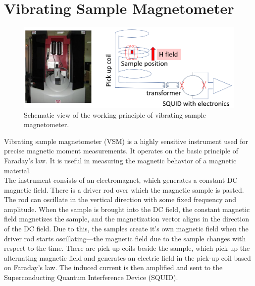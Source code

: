 \documentclass[12pt,a4paper,bold]{thesis}
\theoremstyle{thm}
\theoremstyle{definition}
\begin{document}
\section{Vibrating Sample Magnetometer}
\begin{figure}[H]
	\centering
   \includegraphics[width=12cm]{Images/54.png} 
   \caption{Schematic view of the working principle of vibrating sample magnetometer.}
\end{figure}
\indent \indent\indent Vibrating sample magnetometer (VSM) is a highly sensitive instrument used for precise magnetic moment measurements. It operates on the basic principle of Faraday's law. It is useful in measuring the magnetic behavior of a magnetic material.\\
\indent \indent The instrument consists of an electromagnet, which generates a constant DC magnetic field. There is a driver rod over which the magnetic sample is pasted. The rod can oscillate in the vertical direction with some fixed frequency and amplitude. When the sample is brought into the DC field, the constant magnetic field magnetizes the sample, and the magnetization vector aligns in the direction of the DC field. Due to this, the samples create it's own magnetic field when the driver rod starts oscillating—the magnetic field due to the sample changes with respect to the time. There are pick-up coils beside the sample, which pick up the alternating magnetic field and generates an electric field in the pick-up coil based on Faraday's law. The induced current is then amplified and sent to the Superconducting Quantum Interference Device (SQUID).
\pagebreak
\end{document}
